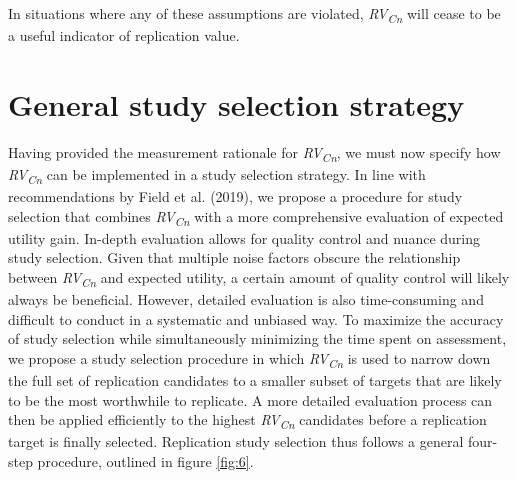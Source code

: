 \documentclass[
  english,
  man,floatsintext]{apa6}
\begin{document}
In situations where any of these assumptions are violated, \emph{RV\textsubscript{Cn}} will cease to be a useful indicator of replication value.

\hypertarget{general-study-selection-strategy}{%
\section{General study selection strategy}\label{general-study-selection-strategy}}

Having provided the measurement rationale for \emph{RV\textsubscript{Cn}}, we must now specify how \emph{RV\textsubscript{Cn}} can be implemented in a study selection strategy. In line with recommendations by Field et al. (2019), we propose a procedure for study selection that combines \emph{RV\textsubscript{Cn}} with a more comprehensive evaluation of expected utility gain. In-depth evaluation allows for quality control and nuance during study selection. Given that multiple noise factors obscure the relationship between \emph{RV\textsubscript{Cn}} and expected utility, a certain amount of quality control will likely always be beneficial. However, detailed evaluation is also time-consuming and difficult to conduct in a systematic and unbiased way. To maximize the accuracy of study selection while simultaneously minimizing the time spent on assessment, we propose a study selection procedure in which \emph{RV\textsubscript{Cn}} is used to narrow down the full set of replication candidates to a smaller subset of targets that are likely to be the most worthwhile to replicate. A more detailed evaluation process can then be applied efficiently to the highest \emph{RV\textsubscript{Cn}} candidates before a replication target is finally selected. Replication study selection thus follows a general four-step procedure, outlined in figure \ref{fig:6}.
\end{document}

